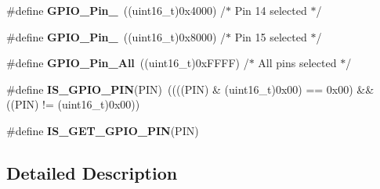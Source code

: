 \begin{DoxyCompactItemize}
\item 
\hypertarget{group___g_p_i_o__pins__define_ga21cd1d89c0c061a6f09c5a842610bee5}{\#define {\bfseries G\-P\-I\-O\-\_\-\-Pin\-\_}~((uint16\-\_\-t)0x4000)  /$\ast$ Pin 14 selected $\ast$/}\label{group___g_p_i_o__pins__define_ga21cd1d89c0c061a6f09c5a842610bee5}

\item 
\hypertarget{group___g_p_i_o__pins__define_gae686a9fc47cf3e420e5db0784210711d}{\#define {\bfseries G\-P\-I\-O\-\_\-\-Pin\-\_}~((uint16\-\_\-t)0x8000)  /$\ast$ Pin 15 selected $\ast$/}\label{group___g_p_i_o__pins__define_gae686a9fc47cf3e420e5db0784210711d}

\item 
\hypertarget{group___g_p_i_o__pins__define_gaba3e915ddca17a1211edc07b7fd97e8b}{\#define {\bfseries G\-P\-I\-O\-\_\-\-Pin\-\_\-\-All}~((uint16\-\_\-t)0x\-F\-F\-F\-F)  /$\ast$ All pins selected $\ast$/}\label{group___g_p_i_o__pins__define_gaba3e915ddca17a1211edc07b7fd97e8b}

\item 
\hypertarget{group___g_p_i_o__pins__define_gad6ec74e33360395535ad5d91ba6d4781}{\#define {\bfseries I\-S\-\_\-\-G\-P\-I\-O\-\_\-\-P\-I\-N}(P\-I\-N)~((((P\-I\-N) \& (uint16\-\_\-t)0x00) == 0x00) \&\& ((\-P\-I\-N) != (uint16\-\_\-t)0x00))}\label{group___g_p_i_o__pins__define_gad6ec74e33360395535ad5d91ba6d4781}

\item 
\#define {\bfseries I\-S\-\_\-\-G\-E\-T\-\_\-\-G\-P\-I\-O\-\_\-\-P\-I\-N}(P\-I\-N)
\end{DoxyCompactItemize}


\subsection{Detailed Description}


